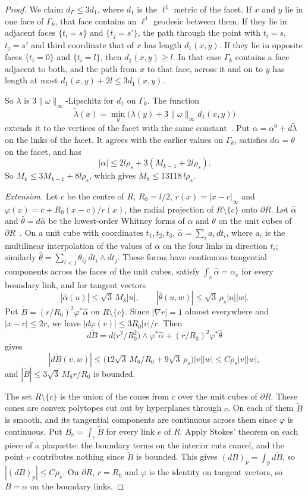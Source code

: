 \documentclass[11pt]{amsart}
\theoremstyle{definition}
\theoremstyle{remark}
\numberwithin{equation}{section}
\begin{document}
\begin{proof}
We claim $d_\Gamma\le3d_1$, where $d_1$ is the $\ell^1$ metric of the
facet. If $x$ and $y$ lie in one face of $\Gamma_k$, that face contains an
$\ell^1$ geodesic between them. If they lie in adjacent faces $\{t_i=s\}$
and $\{t_j=s'\}$, the path through the point with $t_i=s$, $t_j=s'$ and
third coordinate that of $x$ has length $d_1(x,y)$. If they lie in opposite
faces $\{t_i=0\}$ and $\{t_i=l\}$, then $d_1(x,y)\ge l$. In that case
$\Gamma_k$ contains a face adjacent to both, and the path from $x$ to that
face, across it and on to $y$ has length at most $d_1(x,y)+2l\le3d_1(x,y)$.

So $\lambda$ is $3\lVert\omega\rVert_\infty$-Lipschitz for $d_1$ on
$\Gamma_k$. The function
\[
\tilde\lambda(x)=\min_y\bigl(\lambda(y)+3\lVert\omega\rVert_\infty d_1(x,y)
\bigr)
\]
extends it to the vertices of the facet with the same constant~\cite{McS34}.
Put $\alpha=\alpha^0+d\tilde\lambda$ on the links of the facet. It agrees
with the earlier values on $\Gamma_k$, satisfies $d\alpha=\theta$ on the
facet, and has
\[
|\alpha|\le2l\rho_s+3(M_{k-1}+2l\rho_s).
\]
So $M_k\le3M_{k-1}+8l\rho_s$, which gives $M_8\le13118\,l\rho_s$.

\emph{Extension.} Let $c$ be the centre of $R$, $R_0=l/2$, $r(x)=|x-c|_\infty$
and $\varphi(x)=c+R_0(x-c)/r(x)$, the radial projection of $R\setminus\{c\}$
onto $\partial R$. Let $\hat\alpha$ and $\hat\theta=d\hat\alpha$ be the
lowest-order Whitney forms of $\alpha$ and $\theta$ on the unit cubes of
$\partial R$~\cite{Whi57}. On a unit cube with coordinates $t_1,t_2,t_3$,
$\hat\alpha=\sum_ia_i\,dt_i$, where $a_i$ is the multilinear interpolation of
the values of $\alpha$ on the four links in direction $t_i$; similarly
$\hat\theta=\sum_{i<j}\theta_{ij}\,dt_i\wedge dt_j$. These forms have
continuous tangential components across the faces of the unit cubes, satisfy
$\int_e\hat\alpha=\alpha_e$ for every boundary link, and for tangent
vectors
\[
|\hat\alpha(u)|\le\sqrt3\,M_8|u|,\qquad|\hat\theta(u,w)|\le\sqrt3\,\rho_s
|u||w| .
\]
Put $\tilde B=(r/R_0)^2\varphi^*\hat\alpha$ on $R\setminus\{c\}$. Since
$|\nabla r|=1$ almost everywhere and $|x-c|\le2r$, we have $|d\varphi(v)|\le
3R_0|v|/r$. Then
\[
d\tilde B=d\bigl(r^2/R_0^2\bigr)\wedge\varphi^*\hat\alpha+(r/R_0)^2
\varphi^*\hat\theta
\]
gives
\[
|d\tilde B(v,w)|\le\bigl(12\sqrt3\,M_8/R_0+9\sqrt3\,\rho_s\bigr)|v||w|\le
C\rho_s|v||w| ,
\]
and $|\tilde B|\le3\sqrt3\,M_8r/R_0$ is bounded.

The set $R\setminus\{c\}$ is the union of the cones from $c$ over the unit
cubes of $\partial R$. These cones are convex polytopes cut out by
hyperplanes through $c$. On each of them $\tilde B$ is smooth, and its
tangential components are continuous across them since $\varphi$ is
continuous. Put $B_e=\int_e\tilde B$ for every link $e$ of $R$. Apply
Stokes' theorem on each piece of a plaquette: the boundary terms on the
interior cuts cancel, and the point $c$ contributes nothing since $\tilde B$
is bounded. This gives $(dB)_p=\int_pd\tilde B$, so $|(dB)_p|\le C\rho_s$.
On $\partial R$, $r=R_0$ and $\varphi$ is the identity on tangent vectors,
so $B=\alpha$ on the boundary links.


\end{proof}
\end{document}
